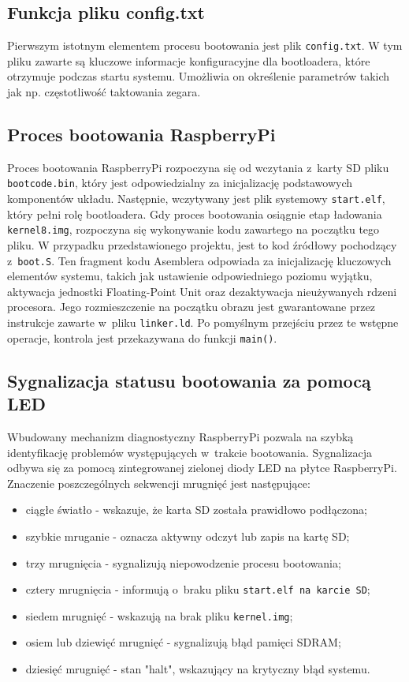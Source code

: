 \documentclass[shortabstract]{iithesis}
\begin{document}
\subsection{Funkcja pliku config.txt}
Pierwszym istotnym elementem procesu bootowania jest plik \texttt{config.txt}. W tym pliku zawarte są kluczowe informacje konfiguracyjne dla bootloadera, które otrzymuje podczas startu systemu. Umożliwia on określenie parametrów takich jak np. częstotliwość taktowania zegara. 
\subsection{Proces bootowania RaspberryPi}
Proces bootowania RaspberryPi rozpoczyna się od wczytania z~karty SD pliku \texttt{bootcode.bin}, który jest odpowiedzialny za inicjalizację podstawowych komponentów układu. Następnie, wczytywany jest plik systemowy \texttt{start.elf}, który pełni rolę bootloadera. Gdy proces bootowania osiągnie etap ładowania \texttt{kernel8.img}, rozpoczyna się wykonywanie kodu zawartego na początku tego pliku. W przypadku przedstawionego projektu, jest to kod źródłowy pochodzący z~\texttt{boot.S}. Ten fragment kodu Asemblera odpowiada za inicjalizację kluczowych elementów systemu, takich jak ustawienie odpowiedniego poziomu wyjątku, aktywacja jednostki Floating-Point Unit oraz dezaktywacja nieużywanych rdzeni procesora. Jego rozmieszczenie na początku obrazu jest gwarantowane przez instrukcje zawarte w~pliku \texttt{linker.ld}. Po pomyślnym przejściu przez te wstępne operacje, kontrola jest przekazywana do funkcji \texttt{main()}.
\subsection{Sygnalizacja statusu bootowania za pomocą LED}
Wbudowany mechanizm diagnostyczny RaspberryPi pozwala na szybką identyfikację problemów występujących w~trakcie bootowania. Sygnalizacja odbywa się za pomocą zintegrowanej zielonej diody LED na płytce RaspberryPi. Znaczenie poszczególnych sekwencji mrugnięć jest następujące:
\begin{itemize}
 \item ciągłe światło - wskazuje, że karta SD została prawidłowo podłączona;
 \item szybkie mruganie - oznacza aktywny odczyt lub zapis na kartę SD;
 \item trzy mrugnięcia - sygnalizują niepowodzenie procesu bootowania;
 \item cztery mrugnięcia - informują o~braku pliku \texttt{start.elf na karcie SD};
 \item siedem mrugnięć - wskazują na brak pliku \texttt{kernel.img};
 \item osiem lub dziewięć mrugnięć - sygnalizują błąd pamięci SDRAM;
 \item dziesięć mrugnięć - stan "halt", wskazujący na krytyczny błąd systemu.
\end{itemize}
\end{document}
